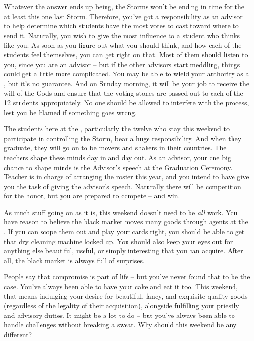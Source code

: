 \documentclass[char]{GL2020}
\begin{document}
Whatever the answer ends up being, the Storms won’t be ending in time for the at least this one last Storm. Therefore, you’ve got a responsibility as an advisor to help determine which students have the most votes to cast toward where to send it. Naturally, you wish to give the most influence to a student who thinks like you. As soon as you figure out what you should think, and how each of the students feel themselves, you can get right on that. Most of them should listen to you, since you are an advisor -- but if the other advisors start meddling, things could get a little more complicated. You may be able to wield your authority as a \cHedonist{\cleric}, but it’s no guarantee. And on Sunday morning, it will be your job to receive the will of the Gods and ensure that the voting stones are passed out to each of the 12 students appropriately. No one should be allowed to interfere with the process, lest you be blamed if something goes wrong.

The students here at the \pSc{}, particularly the twelve who stay this weekend to participate in controlling the Storm, bear a huge responsibility. And when they graduate, they will go on to be movers and shakers in their countries. The teachers shape these minds day in and day out. As an advisor, your one big chance to shape minds is the Advisor’s speech at the Graduation Ceremony. Teacher \cMusic{} is in charge of arranging the roster this year, and you intend to have \cMusic{\them} give you the task of giving the advisor’s speech. Naturally there will be competition for the honor, but you are prepared to compete -- and win.

As much stuff going on as it is, this weekend doesn’t need to be \emph{all} work. You have reason to believe the black market moves many goods through agents at the \pSc{}. If you can scope them out and play your cards right, you should be able to get that dry cleaning machine locked up. You should also keep your eyes out for anything else beautiful, useful, or simply interesting that you can acquire. After all, the black market is always full of surprises.

People say that compromise is part of life -- but you’ve never found that to be the case. You’ve always been able to have your cake and eat it too. This weekend, that means indulging your desire for beautiful, fancy, and exquisite quality goods (regardless of the legality of their acquisition), alongside fulfilling your priestly and advisory duties. It might be a lot to do -- but you’ve always been able to handle challenges without breaking a sweat. Why should this weekend be any different?
\end{document}
